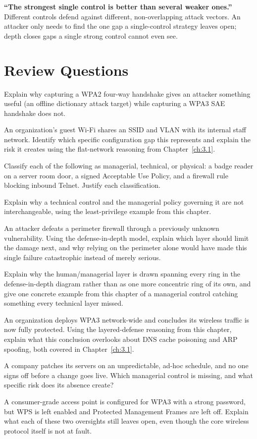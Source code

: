 \begin{misconception}
\textbf{``The strongest single control is better than several weaker ones.''} Different controls
defend against different, non-overlapping attack vectors. An attacker only needs to find the one
gap a single-control strategy leaves open; depth closes gaps a single strong control cannot even
see.
\end{misconception}

\section*{Review Questions}
\begin{reviewquestions}
\item Explain why capturing a WPA2 four-way handshake gives an attacker something useful (an
offline dictionary attack target) while capturing a WPA3 SAE handshake does not.
\item An organization's guest Wi-Fi shares an SSID and VLAN with its internal staff network.
Identify which specific configuration gap this represents and explain the risk it creates using
the flat-network reasoning from Chapter~\ref{ch:3.1}.
\item Classify each of the following as managerial, technical, or physical: a badge reader on a
server room door, a signed Acceptable Use Policy, and a firewall rule blocking inbound Telnet.
Justify each classification.
\item Explain why a technical control and the managerial policy governing it are not
interchangeable, using the least-privilege example from this chapter.
\item An attacker defeats a perimeter firewall through a previously unknown vulnerability. Using
the defense-in-depth model, explain which layer should limit the damage next, and why relying on
the perimeter alone would have made this single failure catastrophic instead of merely serious.
\item Explain why the human/managerial layer is drawn spanning every ring in the defense-in-depth
diagram rather than as one more concentric ring of its own, and give one concrete example from
this chapter of a managerial control catching something every technical layer missed.
\item An organization deploys WPA3 network-wide and concludes its wireless traffic is now fully
protected. Using the layered-defense reasoning from this chapter, explain what this conclusion
overlooks about DNS cache poisoning and ARP spoofing, both covered in Chapter~\ref{ch:3.1}.
\item A company patches its servers on an unpredictable, ad-hoc schedule, and no one signs off
before a change goes live. Which managerial control is missing, and what specific risk does its
absence create?
\item A consumer-grade access point is configured for WPA3 with a strong password, but WPS is left
enabled and Protected Management Frames are left off. Explain what each of these two oversights
still leaves open, even though the core wireless protocol itself is not at fault.
\end{reviewquestions}

